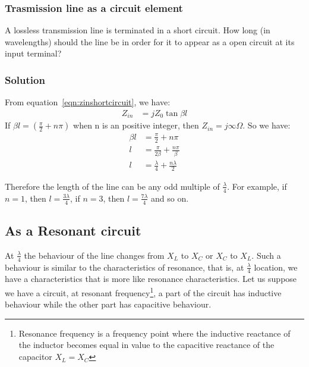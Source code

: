 \begin{exmp}
\subsubsection*{Trasmission line as a circuit element}
A lossless transmission line is terminated in a short circuit. How long (in wavelengths) should the line be in order for it to appear as a open circuit at its input terminal?

\subsubsection*{Solution}
From equation~\eqref{eqn:zinshortcircuit}, we have:
\begin{align*}
Z_{in} &= jZ_{0}\tan\beta l
\end{align*}
If $\beta l = (\frac{\pi}{2} + n\pi)$ when n is an positive integer, then $Z_{in} = j\infty\varOmega$. So we have:
\begin{align*}
\beta l &= \frac{\pi}{2} + n\pi\\
l &= \frac{\pi}{2\beta} + \frac{n\pi}{\beta}\\
l &= \frac{\lambda}{4} + \frac{n\lambda}{2}
\end{align*}

Therefore the length of the line can be any odd multiple of $\frac{\lambda}{4}$. For example, if $n = 1$, then $l = \frac{3\lambda}{4}$, if $n = 3$, then $l = \frac{7\lambda}{4}$ and so on.
\end{exmp}

\subsection{As a Resonant circuit}
At $ \frac{\lambda}{4} $ the behaviour of the line changes from $ X_{L} $ to $ X_{C} $ or $ X_{C} $ to $ X_{L} $. Such a behaviour is similar to the characteristics of resonance, that is, at $\frac{\lambda}{4}$  location, we have a characteristics that is more like resonance characteristics. Let us suppose we have a circuit, at resonant frequency\footnote{
Resonance frequency is a frequency point where the inductive reactance of the inductor becomes equal in value to the capacitive reactance of the capacitor $ X_{L} = X_{C} $
}, a part of the circuit has inductive behaviour while the other part has capacitive behaviour. 

